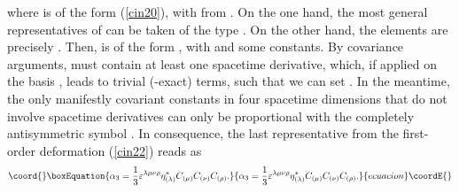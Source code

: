 \documentclass[a4paper,12pt]{article}
\begin{document}
where \coordHE{} is of the form (\ref{cin20}), with \coordHE{} from \coordHE{}. On the one hand, the most general
representatives of \coordHE{} can be taken of the type
\myHighlight{$\eta _{(\lambda )}^{*}$}\coordHE{}. On the other hand, the elements
\coordHE{} are
precisely \coordHE{}. Then, \coordHE{} is of the form \coordHE{}, with \coordHE{} and \coordHE{} some constants. By covariance arguments, \coordHE{} must contain at least one spacetime derivative,
which, if applied on the basis \coordHE{}, leads
to trivial (\myHighlight{$\gamma $}\coordHE{}-exact) terms, such that we can set \coordHE{}. In the meantime, the only manifestly
covariant constants \coordHE{} in four spacetime
dimensions that do not involve spacetime derivatives can only be
proportional with the completely antisymmetric symbol \myHighlight{$\varepsilon
^{\lambda \mu \nu \rho }$}\coordHE{}. In consequence, the last representative
from the first-order deformation (\ref {cin22}) reads as
\begin{equation}\coord{}\boxEquation{
\alpha _{3}=\frac{1}{3}\varepsilon ^{\lambda \mu \nu \rho }\eta _{(\lambda
)}^{*}C_{(\mu )}C_{(\nu )}C_{(\rho )}.  \label{cin25}
}{
\alpha _{3}=\frac{1}{3}\varepsilon ^{\lambda \mu \nu \rho }\eta _{(\lambda
)}^{*}C_{(\mu )}C_{(\nu )}C_{(\rho )}.  }{ecuacion}\coordE{}\end{equation}
\end{document}
